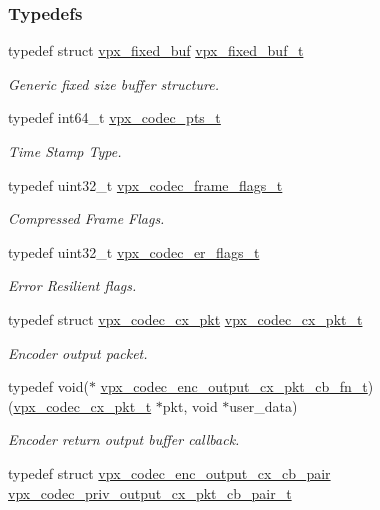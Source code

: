 \subsubsection*{Typedefs}
\begin{DoxyCompactItemize}
\item 
typedef struct \hyperlink{structvpx__fixed__buf}{vpx\+\_\+fixed\+\_\+buf} \hyperlink{group__encoder_ga21fab7dd28065f349c97165501223764}{vpx\+\_\+fixed\+\_\+buf\+\_\+t}
\begin{DoxyCompactList}\small\item\em Generic fixed size buffer structure. \end{DoxyCompactList}\item 
typedef int64\+\_\+t \hyperlink{group__encoder_ga7e711b0a71c65aef8f0faea8bd57b05f}{vpx\+\_\+codec\+\_\+pts\+\_\+t}
\begin{DoxyCompactList}\small\item\em Time Stamp Type. \end{DoxyCompactList}\item 
typedef uint32\+\_\+t \hyperlink{group__encoder_gaac8ee319b9a6175f6946f59437c7ae4b}{vpx\+\_\+codec\+\_\+frame\+\_\+flags\+\_\+t}
\begin{DoxyCompactList}\small\item\em Compressed Frame Flags. \end{DoxyCompactList}\item 
typedef uint32\+\_\+t \hyperlink{group__encoder_ga77e0e1fff62556a4f4d54c84467a41f3}{vpx\+\_\+codec\+\_\+er\+\_\+flags\+\_\+t}
\begin{DoxyCompactList}\small\item\em Error Resilient flags. \end{DoxyCompactList}\item 
typedef struct \hyperlink{structvpx__codec__cx__pkt}{vpx\+\_\+codec\+\_\+cx\+\_\+pkt} \hyperlink{group__encoder_ga3f711e17fbefac545e8959ef5a023556}{vpx\+\_\+codec\+\_\+cx\+\_\+pkt\+\_\+t}
\begin{DoxyCompactList}\small\item\em Encoder output packet. \end{DoxyCompactList}\item 
typedef void($\ast$ \hyperlink{group__encoder_ga2ced5dac1f5d963a38bd4d2a05ec8bd9}{vpx\+\_\+codec\+\_\+enc\+\_\+output\+\_\+cx\+\_\+pkt\+\_\+cb\+\_\+fn\+\_\+t}) (\hyperlink{group__encoder_ga3f711e17fbefac545e8959ef5a023556}{vpx\+\_\+codec\+\_\+cx\+\_\+pkt\+\_\+t} $\ast$pkt, void $\ast$user\+\_\+data)
\begin{DoxyCompactList}\small\item\em Encoder return output buffer callback. \end{DoxyCompactList}\item 
typedef struct \hyperlink{structvpx__codec__enc__output__cx__cb__pair}{vpx\+\_\+codec\+\_\+enc\+\_\+output\+\_\+cx\+\_\+cb\+\_\+pair} \hyperlink{group__encoder_gac8a2ccecf20463a7bd52bad87410ba45}{vpx\+\_\+codec\+\_\+priv\+\_\+output\+\_\+cx\+\_\+pkt\+\_\+cb\+\_\+pair\+\_\+t}\hypertarget{group__encoder_gac8a2ccecf20463a7bd52bad87410ba45}{}\label{group__encoder_gac8a2ccecf20463a7bd52bad87410ba45}


\end{DoxyCompactItemize}
